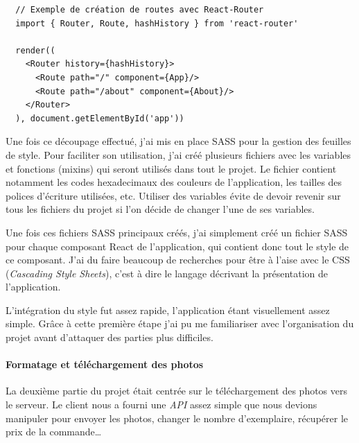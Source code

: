 \documentclass[12pt,a4paper]{article}
\begin{document}
  \begin{verbatim}
  // Exemple de création de routes avec React-Router
  import { Router, Route, hashHistory } from 'react-router'

  render((
    <Router history={hashHistory}>
      <Route path="/" component={App}/>
      <Route path="/about" component={About}/>
    </Router>
  ), document.getElementById('app'))
  \end{verbatim}

  \bigskip

  Une fois ce découpage effectué, j'ai mis en place SASS pour la gestion
  des feuilles de style. Pour faciliter son utilisation, j'ai créé
  plusieurs fichiers avec les variables et fonctions (mixins) qui seront
  utilisés dans tout le projet. Le fichier contient notamment les codes
  hexadecimaux des couleurs de l'application, les tailles des polices
  d'écriture utilisées, etc. Utiliser des variables évite de devoir
  revenir sur tous les fichiers du projet si l'on décide de changer l'une
  de ses variables.

  \bigskip

  Une fois ces fichiers SASS principaux créés, j'ai simplement créé un
  fichier SASS pour chaque composant React de l'application, qui contient
  donc tout le style de ce composant. J'ai du faire beaucoup de recherches
  pour être à l'aise avec le CSS (\emph{Cascading Style Sheets}), c'est à
  dire le langage décrivant la présentation de l'application.

  \bigskip

  L'intégration du style fut assez rapide, l'application étant
  visuellement assez simple. Grâce à cette première étape j'ai pu me
  familiariser avec l'organisation du projet avant d'attaquer des parties
  plus difficiles.

  \bigskip

  \paragraph{Formatage et téléchargement des
  photos}\label{formatage-et-tuxe9luxe9chargement-des-photos}

  \bigskip

  La deuxième partie du projet était centrée sur le téléchargement des
  photos vers le serveur. Le client nous a fourni une \emph{API} assez
  simple que nous devions manipuler pour envoyer les photos, changer le
  nombre d'exemplaire, récupérer le prix de la commande\ldots{}
\end{document}
